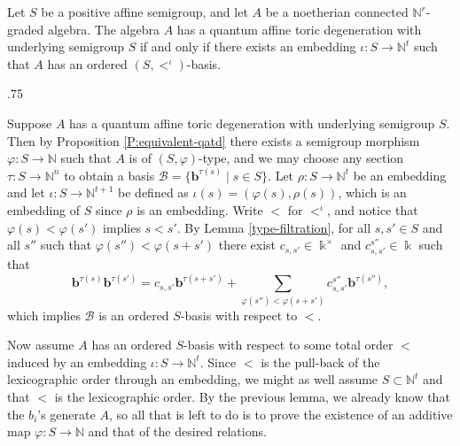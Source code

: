 \documentclass[11pt,fleqn]{article}
\makeatletter
\renewenvironment{proof}[1][\textit{Proof}]{\par
  \pushQED{\qed}%
  \normalfont \topsep.75\paraskip\relax
  \trivlist
  \item[\hskip\labelsep
        \itshape
    #1\@addpunct{.}]\ignorespaces
}{%
  \popQED\endtrivlist\@endpefalse
}
\newcommand\NN{\mathbb N}
\renewcommand\to{\longrightarrow}
\renewcommand\phi{\varphi}
\renewcommand\b{\mathbf b}
\renewcommand\k{\Bbbk}
\makeatother
\begin{document}
\begin{Proposition*}
Let $S$ be a positive affine semigroup, and let $A$ be a noetherian connected 
$\NN^r$-graded algebra.
The algebra $A$ has a quantum affine toric degeneration with underlying semigroup $S$ if 
and only if there exists an embedding $\iota: S \to \NN^t$ such that $A$ has an 
ordered $(S, <^\iota)$-basis.
\end{Proposition*}
\begin{proof}
Suppose $A$ has a quantum affine toric degeneration with underlying semigroup $S$. Then 
by Proposition \ref{P:equivalent-qatd} there exists a semigroup morphism $\phi:S\to 
\NN$ such that $A$ is of $(S, \phi)$-type, and we may choose any section $\tau: S \to 
\NN^n$ to obtain a basis $\mathcal B = \{\b^{\tau(s)} \mid s \in S\}$. Let $\rho: S \to 
\NN^{t}$ be an embedding and let $\iota: S \to \NN^{t+1}$ be defined as $\iota(s) = 
(\phi(s), \rho(s))$, which is an embedding of $S$ since $\rho$ is an embedding. Write $<$ 
for $<^\iota$, and notice that $\phi(s) < \phi(s')$ implies $s<s'$. By Lemma 
\ref{type-filtration}, for all $s,s' \in S$ and all $s''$ such that $\phi(s'') < 
\phi(s+s')$ there exist $c_{s,s'} \in \k^\times$ and $c_{s,s'}^{s''} \in \k$ such that
\[
  \b^{\tau(s)}\b^{\tau(s')} 
    = c_{s,s'}\b^{\tau(s+s')} 
      + \sum_{\phi(s'') < \phi(s+s')} c_{s,s'}^{s''} \b^{\tau(s'')},
\]
which implies $\mathcal B$ is an ordered $S$-basis with respect to $<$.

Now assume $A$ has an ordered $S$-basis with respect to some total order $<$ induced 
by an embedding $\iota: S \to \NN^t$. Since $<$ is the pull-back of the lexicographic 
order through an embedding, we might as well assume $S \subset \NN^t$ and that $<$ is 
the lexicographic order. By the previous lemma, we already know that the $b_i$'s 
generate $A$, so all that is left to do is to prove the existence of an additive
map $\phi:S \to \NN$ and that of the desired relations.


\end{proof}
\end{document}
